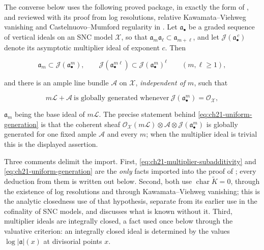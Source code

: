 The converse below uses the following proved package, in exactly the form of
\cite[Appendix~B]{BFJ16}, and reviewed with its proof from log resolutions,
relative Kawamata--Viehweg vanishing and Castelnuovo--Mumford regularity in
.  Let $\mathfrak a_\bullet$ be a
graded sequence of vertical ideals on an SNC model $\mathcal X$, so that
$\mathfrak a_m\mathfrak a_\ell\subset\mathfrak a_{m+\ell}$, and let
$\mathcal J(\mathfrak a_\bullet^{\,c})$ denote its asymptotic multiplier
ideal of exponent $c$.  Then

\begin{equation}
\label{eq:ch21-multiplier-subadditivity}
 \mathfrak a_m\subset
 \mathcal J(\mathfrak a_\bullet^m),
 \qquad
 \mathcal J(\mathfrak a_\bullet^{m\ell})
 \subset\mathcal J(\mathfrak a_\bullet^m)^\ell
 \qquad(m,\ell\geq1),
\end{equation}

and there is an ample line bundle $\mathcal A$ on $\mathcal X$,
\emph{independent of $m$}, such that

\begin{equation}
\label{eq:ch21-uniform-generation}
 m\mathcal L+\mathcal A\ \text{is globally generated whenever}\
 \mathcal J(\mathfrak a_\bullet^m)=\mathcal O_{\mathcal X},
\end{equation}

$\mathfrak a_m$ being the base ideal of $m\mathcal L$.  The precise
statement behind \eqref{eq:ch21-uniform-generation} is that the coherent
sheaf
$\mathcal O_{\mathcal X}(m\mathcal L)\otimes\mathcal A\otimes
\mathcal J(\mathfrak a_\bullet^m)$ is globally generated for one fixed
ample $\mathcal A$ and every $m$; when the multiplier ideal is trivial
this is the displayed assertion.

Three comments delimit the import.  First,
\eqref{eq:ch21-multiplier-subadditivity} and
\eqref{eq:ch21-uniform-generation} are the \emph{only} facts imported into
the proof of \Cref{thm:ch21-model-consistency}; every deduction from them is
written out below.  Second, both use
$\operatorname{char}\widetilde K=0$, through the existence of log
resolutions and through Kawamata--Viehweg vanishing; this is the analytic
closedness use of that hypothesis, separate from its earlier use in the
cofinality of SNC models, and
 discusses what is known without it.  Third,
multiplier ideals are integrally closed, a fact used once below through the
valuative criterion: an integrally closed ideal is determined by the values
$\log|\mathfrak a|(x)$ at divisorial points $x$.

